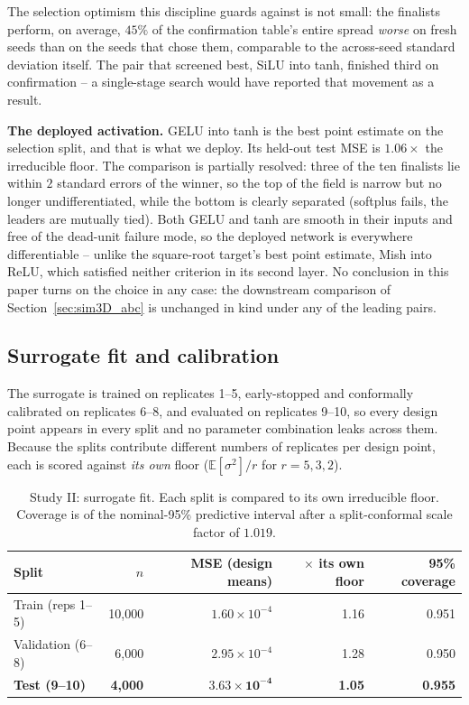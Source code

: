 \documentclass[sn-basic,iicol,pdflatex]{sn-jnl}
\begin{document}
The selection optimism this discipline guards against is not small: the
finalists perform, on average, $45\%$ of the confirmation table's entire
spread \emph{worse} on fresh seeds than on the seeds that chose them,
comparable to the across-seed standard deviation itself. The pair that
screened best, SiLU into tanh, finished third on confirmation -- a
single-stage search would have reported that movement as a result.

\noindent\textbf{The deployed activation.} GELU into tanh is the best point estimate
on the selection split, and that is what we deploy. Its held-out test MSE is
$1.06\times$ the irreducible floor. The comparison is partially resolved:
three of the ten finalists lie within $2$ standard errors of the winner, so
the top of the field is narrow but no longer undifferentiated, while the
bottom is clearly separated (softplus fails, the leaders are mutually
tied). Both GELU and tanh are smooth in their inputs and free of the
dead-unit failure mode, so the deployed network is everywhere
differentiable -- unlike the square-root target's best point estimate, Mish
into ReLU, which satisfied neither criterion in its second layer.
No conclusion in this paper turns on the choice in any case: the downstream
comparison of Section~\ref{sec:sim3D_abc} is unchanged in kind under any of
the leading pairs.

\subsection{Surrogate fit and calibration}
\label{sec:sim3D_fit}

The surrogate is trained on replicates 1--5, early-stopped and conformally
calibrated on replicates 6--8, and evaluated on replicates 9--10, so every
design point appears in every split and no parameter combination leaks across
them. Because the splits contribute different numbers of replicates per design
point, each is scored against \emph{its own} floor
($\mathbb{E}[\sigma^2]/r$ for $r = 5, 3, 2$).

\begin{table}[t]
\centering
\caption{Study II: surrogate fit. Each split is compared to its own irreducible
floor. Coverage is of the nominal-95\% predictive interval after a
split-conformal scale factor of $1.019$.}
\label{tab:fit3D}
\begin{tabular}{lrrrr}
\toprule
Split & $n$ & MSE (design means) & $\times$ its own floor & 95\% coverage \\
\midrule
Train (reps 1--5) & 10{,}000 & $1.60\times10^{-4}$ & 1.16 & 0.951 \\
Validation (6--8) & 6{,}000 & $2.95\times10^{-4}$ & 1.28 & 0.950 \\
\textbf{Test (9--10)} & \textbf{4{,}000} & $\mathbf{3.63\times10^{-4}}$ & \textbf{1.05} & \textbf{0.955} \\
\bottomrule
\end{tabular}
\end{table}
\end{document}
